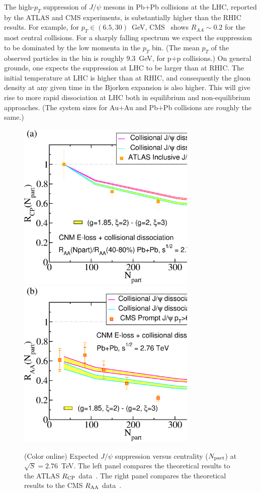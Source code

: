\documentclass[article,showpacs,preprintnumbers,amsmath,amssymb]{revtex4}
\begin{document}
The high-$p_T$ suppression of $J/\psi$ mesons in Pb$+$Pb collisions at the LHC,
reported by the ATLAS and CMS experiments, is substantially higher than the RHIC
results.  For example, for $p_T\in(6.5,30)$~GeV, CMS~\cite{Chatrchyan:2012np}
shows $R_{AA}\sim 0.2$ for the most central collisions. For a sharply falling
spectrum we expect the suppression to be dominated by the low momenta in the
$p_T$ bin. (The mean $p_T$ of the observed particles in the bin is roughly
$9.3$~GeV, for p$+$p collisions.) On
general grounds, one expects the suppression at LHC to be larger than at RHIC.
The initial temperature at LHC is higher than at RHIC, and consequently the
gluon density at any given time in the Bjorken expansion is also higher. This
will give rise to more rapid dissociation at LHC both in equilibrium and
non-equilibrium approaches. (The system sizes for Au$+$Au and Pb$+$Pb collisions
are roughly the same.) 



\begin{figure}[!t]
\vspace*{.2in}
\includegraphics[width=3.38in,angle=0]{fig10_lhc2760pbpbrcpnpart.eps} 
\includegraphics[width=3.38in,angle=0]{fig11_lhc2760pbpbraanpart.eps} 
\caption{(Color online) Expected $J/\psi$ suppression  versus centrality
($N_{\rm part}$) at $\sqrt{S} = 2.76$~TeV. The left panel compares the
theoretical results to the ATLAS $R_{\rm CP}$ data~\cite{:2010px}.  The right
panel compares the theoretical results to the CMS $R_{\rm AA}$
data~\cite{Chatrchyan:2012np}.
~\label{fig:RNpart}}
\end{figure}
\end{document}
